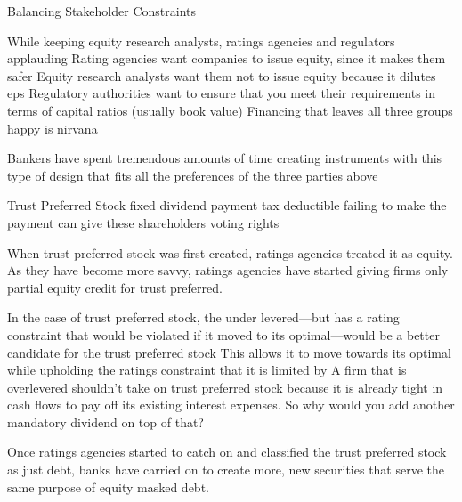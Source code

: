 \documentclass[10pt]{article}
\begin{document}
    \begin{core}{Balancing Stakeholder Constraints}

      While keeping equity research analysts, ratings agencies and regulators applauding
      Rating agencies want companies to issue equity, since it makes them safer
      Equity research analysts want them not to issue equity because it dilutes eps
      Regulatory authorities want to ensure that you meet their requirements in terms of capital ratios (usually book value)
      Financing that leaves all three groups happy is nirvana

      Bankers have spent tremendous amounts of time creating instruments with this type of design that fits all the preferences of the three parties above

      Trust Preferred Stock
      fixed dividend payment
      tax deductible
      failing to make the payment can give these shareholders voting rights

      When trust preferred stock was first created, ratings agencies treated it as equity. As they have become more savvy, ratings agencies have started giving firms only partial equity credit for trust preferred.

      In the case of trust preferred stock, the under levered—but has a rating constraint that would be violated if it moved to its optimal—would be a better candidate for the trust preferred stock
      This allows it to move towards its optimal while upholding the ratings constraint that it is limited by
      A firm that is overlevered shouldn’t take on trust preferred stock because it is already tight in cash flows to pay off its existing interest expenses. So why would you add another mandatory dividend on top of that?

      Once ratings agencies started to catch on and classified the trust preferred stock as just debt, banks have carried on to create more, new securities that serve the same purpose of equity masked debt.

    \end{core}
\end{document}
